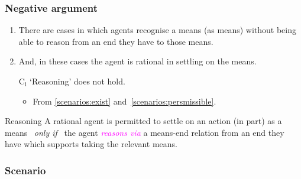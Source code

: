 \documentclass[noamssymb,
]{beamer} %
\newcommand{\hozlinedash}[0]{
  \noindent\hdashrule[0.5ex][c]{\textwidth}{.1pt}{2.5pt}
}
\begin{document}
\begin{frame}
  \frametitle{Negative argument}

  \begin{enumerate}
  \item\label{scenarios:exist} There are cases in which agents recognise a means (as means) without being able to reason from an end they have to those means.
  \item\label{scenarios:persmissible} And, in these cases the agent is rational in settling on the means.

  \item[C\(_{\text{i}}\)] `Reasoning' does not hold.
    \begin{itemize}
    \item From \ref{scenarios:exist} and~\ref{scenarios:persmissible}.
    \end{itemize}
  \end{enumerate}

  \hozlinedash
  {\footnotesize
    \begin{block}{Reasoning}
      A rational agent is permitted to settle on an action (in part) as a means
      \newline
      \mbox{ }\hfill\emph{only if}\hfill\mbox{ }
      \newline
      the agent \textcolor{fuchsia}{\emph{reasons via}}  a means-end relation from an end they have which supports taking the relevant means.
    \end{block}
  }
\end{frame}

\subsubsection{Scenario}
\label{sec:case}
\end{document}
